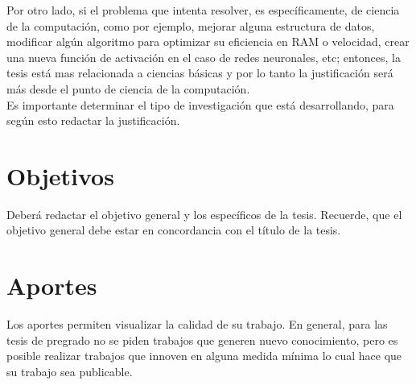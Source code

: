 Por otro lado, si el problema que intenta resolver, es específicamente, de ciencia de la computación, como por ejemplo, mejorar alguna estructura de datos, modificar algún algoritmo para optimizar su eficiencia en RAM o velocidad, crear una nueva función de activación en el caso de redes neuronales, etc; entonces, la tesis está mas relacionada a ciencias básicas y por lo tanto la justificación será más desde el punto de ciencia de la computación.  \\

Es importante determinar el tipo de investigación que está desarrollando, para según esto redactar la justificación.

\section{Objetivos}
Deberá redactar el objetivo general y los específicos de la tesis. Recuerde, que el objetivo general debe estar en concordancia con el título de la tesis.


\section{Aportes}
Los aportes permiten visualizar la calidad de su trabajo. En general, para las tesis de pregrado no se piden trabajos que generen nuevo conocimiento, pero es posible realizar trabajos que innoven en alguna medida  mínima lo cual hace que su trabajo sea publicable.


